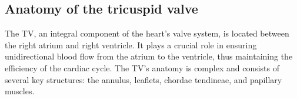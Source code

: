 
\subsection{Anatomy of the tricuspid valve}
The \gls{TV}, an integral component of the heart's valve system, is located between the right atrium and right ventricle. It plays a crucial role in ensuring unidirectional blood flow from the atrium to the ventricle, thus maintaining the efficiency of the cardiac cycle. The \gls{TV}'s anatomy is complex and consists of several key structures: the annulus, leaflets, chordae tendineae, and papillary muscles.

